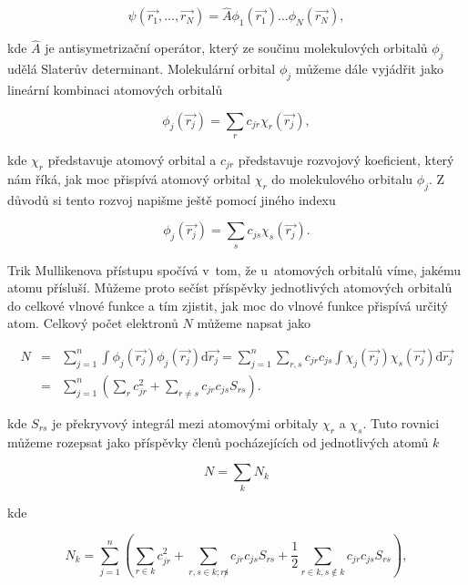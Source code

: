 \begin{equation}
\psi(\vec{r_1}, \dots, \vec{r_N}) = \hat{A} \phi_1 (\vec{r_1}) \dots \phi_N (\vec{r_N}),
\label{rov:Vl-7}
\end{equation}

\noindent kde $\hat{A}$ je antisymetrizační operátor, který ze součinu molekulových orbitalů $\phi_j$ udělá Slaterův determinant. Molekulární orbital $\phi_j$ můžeme dále vyjádřit jako lineární kombinaci atomových orbitalů

\begin{equation}
\phi_j (\vec{r_j}) = \sum_r c_{jr} \chi_r (\vec{r_j}),
\label{rov:Vl-8}
\end{equation}

\noindent kde $\chi_r$ představuje atomový orbital a $c_{jr}$ představuje rozvojový koeficient, který nám říká, jak moc přispívá atomový orbital $\chi_r$ do molekulového orbitalu $\phi_j$. Z~ důvodů si tento rozvoj napišme ještě pomocí jiného indexu

\begin{equation}
\phi_j (\vec{r_j}) = \sum_s c_{js} \chi_s (\vec{r_j}).
\label{rov:Vl-9}
\end{equation}

Trik Mullikenova přístupu spočívá v~tom, že u~atomových orbitalů víme, jakému atomu přísluší. Můžeme proto sečíst příspěvky jednotlivých atomových orbitalů do celkové vlnové funkce a tím zjistit, jak moc do vlnové funkce přispívá určitý atom. Celkový počet elektronů $N$ můžeme napsat jako

\begin{eqnarray}
N &=& \sum_{j=1}^{n} \int \phi_j (\vec{r_j}) \phi_j (\vec{r_j}) \mathrm{d} \vec{r_j} = \sum_{j=1}^{n} \sum_{r,s} c_{jr} c_{js} \int \chi_j (\vec{r_j}) \chi_s (\vec{r_j}) \mathrm{d} \vec{r_j} \nonumber \\
&=& \sum_{j=1}^{n} \left( \sum_r c_{jr}^2 + \sum_{r \not = s} c_{jr} c_{js} S_{rs} \right).
\label{rov:Vl-10}
\end{eqnarray}

\noindent kde $S_{rs}$ je překryvový integrál mezi atomovými orbitaly $\chi_r$ a $\chi_s$. Tuto rovnici můžeme rozepsat jako příspěvky členů pocházejících od jednotlivých atomů $k$

\begin{equation}
N = \sum_k N_k
\label{rov:Vl-11}
\end{equation}

\noindent kde

\begin{equation}
N_k = \sum_{j=1}^{n} \left( \sum_{r \in k} c_{jr}^2 + \sum_{r,s \in k; r \not s} c_{jr} c_{js} S_{rs} + \frac{1}{2} \sum_{r \in k, s \not \in k} c_{jr} c_{js} S_{rs} \right),
\label{rov:Vl-12}
\end{equation}

